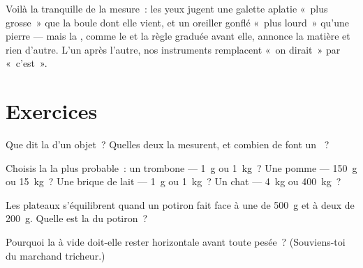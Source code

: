 \begin{remark}\label{rem:g3:measuring-mass:appearances}
Voilà la  tranquille de la mesure~: les yeux jugent une galette
aplatie «~plus grosse~» que la boule dont elle vient, et un oreiller
gonflé «~plus lourd~» qu'une pierre --- mais la , comme le
 et la règle graduée avant elle, annonce la matière et
rien d'autre. L'un après l'autre, nos instruments remplacent «~on
dirait~» par «~c'est~».
\end{remark}

\section{Exercices}

\begin{exercise}[$\star$]\label{exo:g3:measuring-mass:1}
Que dit la  d'un objet~? Quelles deux  la mesurent, et
combien de  font un ~?
\end{exercise}

\begin{exercise}[$\star$]\label{exo:g3:measuring-mass:2}
Choisis la  la plus probable~: un trombone --- \qty{1}{g} ou
\qty{1}{kg}~? Une pomme --- \qty{150}{g} ou \qty{15}{kg}~? Une brique
de lait --- \qty{1}{g} ou \qty{1}{kg}~? Un chat --- \qty{4}{kg} ou
\qty{400}{kg}~?
\end{exercise}

\begin{exercise}[$\star$]\label{exo:g3:measuring-mass:3}
Les plateaux s'équilibrent quand un potiron fait face à une  de
\qty{500}{g} et à deux  de \qty{200}{g}. Quelle est la  du
potiron~?
\end{exercise}

\begin{exercise}[$\star$]\label{exo:g3:measuring-mass:4}
Pourquoi la  à vide doit-elle rester horizontale avant toute
pesée~? (Souviens-toi du marchand tricheur.)
\end{exercise}

